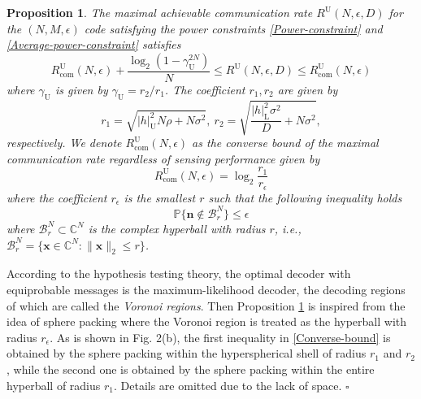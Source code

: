 \documentclass[conference,a4paper]{IEEEtran}
\newenvironment{sproof}{{\indent \indent \it Sketch of Proof:\quad}}{\hfill $\square$\par}
\newcommand{\V}[1]{\bm{#1}} %
\newtheorem{proposition}{Proposition}
\begin{document}
\begin{proposition}
\label{Pro:Converse-bound}
The maximal achievable communication rate $R^\mathrm{U}(N,\epsilon,D)$ for the $(N,M,\epsilon)$ code satisfying the power constraints  \eqref{Power-constraint} and \eqref{Average-power-constraint} satisfies
\begin{equation}
\label{Converse-bound}
R^\mathrm{U}_\mathrm{com}(N,\epsilon)+\frac{\log_2(1-\gamma_\mathrm{U}^{2N}) }{N}  \leq R^\mathrm{U}(N,\epsilon,D) \leq R^\mathrm{U}_\mathrm{com}(N,\epsilon)
\end{equation}
where $\gamma_\mathrm{U}$ is given by $\gamma_\mathrm{U} = r_2/r_1$. The coefficient $r_1,r_2$ are given by
\begin{equation}
{r}_1 = \sqrt{|h|_\mathrm{U}^2N\rho+N\sigma^2},\ {r}_2 = \sqrt{\frac{|h|_\mathrm{L}^2\sigma^2}{D}+N\sigma^2},
\end{equation}
respectively. We denote $R^\mathrm{U}_\mathrm{com}(N,\epsilon)$ as the converse bound of the maximal communication rate regardless of sensing performance given by
\begin{equation}
    R^\mathrm{U}_\mathrm{com}(N,\epsilon) = \log_2\frac{r_1}{r_\epsilon}
\end{equation}
where the coefficient $r_\epsilon$ is the smallest $r$ such that the following inequality holds 
\begin{equation}
\label{r-epsilon}
    \mathbb{P}\{\mathbf{n}\notin \mathcal{B}_r^N\} \leq \epsilon
\end{equation}
where $\mathcal{B}_r^N\subset\mathbb{C}^N$ is the complex hyperball with radius $r$, i.e.,
$\mathcal{B}_r^N = \{\V{x}\in\mathbb{C}^N:\|\V{x}\|_2\leq r\}$.
\end{proposition}

\begin{sproof}
 According to the hypothesis testing theory, the optimal decoder with equiprobable messages is the maximum-likelihood decoder, the decoding regions of which are called the \emph{Voronoi regions}\cite{Sha:J59}. Then Proposition \ref{Pro:Converse-bound} is inspired from the idea of sphere packing where the Voronoi region is treated as the hyperball with radius $r_\epsilon$. As is shown in Fig. 2(b), the first inequality in \eqref{Converse-bound} is obtained by the sphere packing within the hyperspherical shell of radius $r_1$ and $r_2$, while the second one is obtained by the sphere packing within the entire hyperball of radius $r_1$. Details are omitted due to the lack of space.
\end{sproof}
\end{document}
